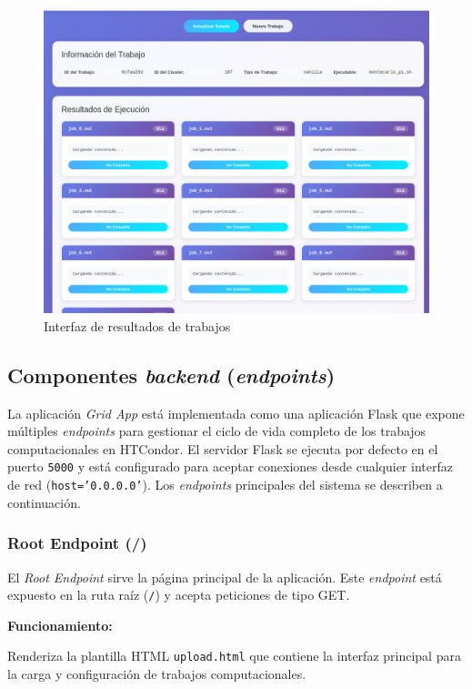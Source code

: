 \begin{figure}[H]
	\centering
	\includegraphics[scale=0.35]{tablas-images/pmv/results-ui-screenshot.png}
	\caption{Interfaz de resultados de trabajos}
	\label{fig:uiResultadosTrabajos}
\end{figure}

\subsection{Componentes \textit{backend} (\textit{endpoints})}
\noindent

La aplicación \textit{Grid App} está implementada como una aplicación Flask que expone múltiples \textit{endpoints} para gestionar el ciclo de vida completo de los trabajos computacionales en HTCondor. El servidor Flask se ejecuta por defecto en el puerto \texttt{5000} y está configurado para aceptar conexiones desde cualquier interfaz de red (\texttt{host='0.0.0.0'}). Los \textit{endpoints} principales del sistema se describen a continuación.

\subsubsection{Root Endpoint (/)}
\noindent

El \textit{Root Endpoint} sirve la página principal de la aplicación. Este \textit{endpoint} está expuesto en la ruta raíz (\texttt{/}) y acepta peticiones de tipo GET.

\textbf{Funcionamiento:}

Renderiza la plantilla HTML \texttt{upload.html} que contiene la interfaz principal para la carga y configuración de trabajos computacionales.

